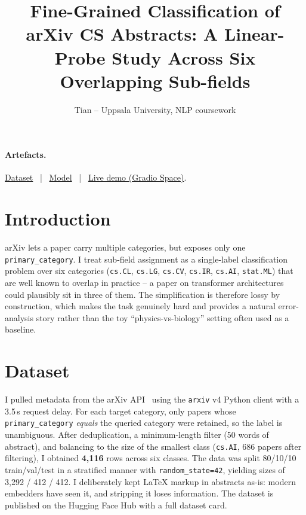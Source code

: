 \documentclass[10pt]{article}
\title{\vspace{-2.5em}\large Fine-Grained Classification of arXiv CS Abstracts:
A Linear-Probe Study Across Six Overlapping Sub-fields}
\author{\small Tian -- Uppsala University, NLP coursework}
\date{\vspace{-2ex}}
\begin{document}
\maketitle
\vspace{-3.5em}

\paragraph{Artefacts.}
\href{https://huggingface.co/datasets/Tiansve/arxiv-cs-subfield}{Dataset} ~|~
\href{https://huggingface.co/Tiansve/arxiv-subfield-linear-probe}{Model} ~|~
\href{https://huggingface.co/spaces/Tiansve/arxiv-subfield-demo}{Live demo (Gradio Space)}.

\section{Introduction}
arXiv lets a paper carry multiple categories, but exposes only one
\texttt{primary\_category}. I treat sub-field assignment as a single-label
classification problem over six categories
(\texttt{cs.CL}, \texttt{cs.LG}, \texttt{cs.CV}, \texttt{cs.IR}, \texttt{cs.AI},
\texttt{stat.ML}) that are well known to overlap in practice -- a paper on
transformer architectures could plausibly sit in three of them. The simplification
is therefore lossy by construction, which makes the task genuinely hard and
provides a natural error-analysis story rather than the toy
``physics-vs-biology'' setting often used as a baseline.

\section{Dataset}
I pulled metadata from the arXiv API~\cite{arxivapi} using the
\texttt{arxiv} v4 Python client with a 3.5\,s request delay. For each target
category, only papers whose \texttt{primary\_category} \emph{equals} the queried
category were retained, so the label is unambiguous. After deduplication, a
minimum-length filter (50 words of abstract), and balancing to the size of the
smallest class (\texttt{cs.AI}, 686 papers after filtering), I obtained
\textbf{4{,}116} rows across six classes. The data was split 80/10/10 train/val/test
in a stratified manner with \texttt{random\_state=42}, yielding sizes of 3{,}292 /
412 / 412. I deliberately kept LaTeX markup in abstracts as-is: modern
embedders have seen it, and stripping it loses information. The dataset is
published on the Hugging Face Hub with a full dataset card.
\end{document}
